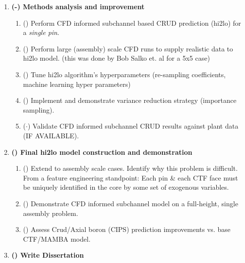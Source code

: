 \begin{enumerate}
\item \textbf{(\checkmark-) Methods analysis and improvement}
    \begin{enumerate}
        \item (\checkmark) Perform CFD informed subchannel based CRUD prediction (hi2lo) for a \emph{single pin}.
        \item (\checkmark) Perform large (assembly) scale CFD runs to supply realistic data to hi2lo model.  (this was done by Bob Salko et. al for a 5x5 case)
        \item (\checkmark) Tune hi2lo algorithm's hyperparameters (re-sampling coefficients, machine learning hyper parameters)
        \item (\checkmark) {\color{blue} Implement and demonstrate variance reduction strategy (importance sampling). }
        \item ($\cdot$) Validate CFD informed subchannel CRUD results against plant data (IF AVAILABLE).
    \end{enumerate}
\item \textbf{(\checkmark) Final hi2lo model construction and demonstration}
    \begin{enumerate}
        \item (\checkmark) Extend to assembly scale cases.  Identify why this problem is difficult.  From a feature engineering standpoint: Each pin \& each CTF face must be uniquely identified in the core by some set of exogenous variables.
        \item (\checkmark) Demonstrate CFD informed subchannel model on a full-height, single assembly problem.
        \item (\checkmark) Assess Crud/Axial boron (CIPS) prediction improvements vs. base CTF/MAMBA model.
    \end{enumerate}
\item \textbf{(\checkmark) Write Dissertation}
\end{enumerate}

